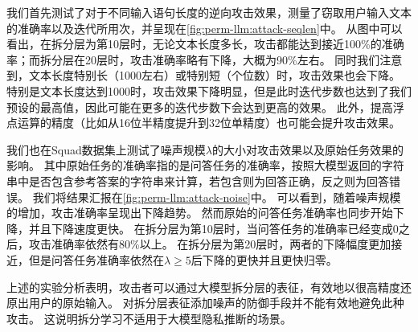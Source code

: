 %
我们首先测试了对于不同输入语句长度的逆向攻击效果，测量了窃取用户输入文本的准确率以及迭代所用次，并呈现在\autoref{fig:perm-llm:attack-seqlen}中。
%
从图中可以看出，在拆分层为第10层时，无论文本长度多长，攻击都能达到接近100\%的准确率；而拆分层在20层时，攻击准确率略有下降，大概为90\%左右。
同时我们注意到，文本长度特别长（1000左右）或特别短（个位数）时，攻击效果也会下降。
%
特别是文本长度达到1000时，攻击效果下降明显，但是此时迭代步数也达到了我们预设的最高值，因此可能在更多的迭代步数下会达到更高的效果。
%
此外，提高浮点运算的精度（比如从16位半精度提升到32位单精度）也可能会提升攻击效果。


我们也在Squad数据集上测试了噪声规模$\lambda$的大小对攻击效果以及原始任务效果的影响。
其中原始任务的准确率指的是问答任务的准确率，按照大模型返回的字符串中是否包含参考答案的字符串来计算，若包含则为回答正确，反之则为回答错误。
%
我们将结果汇报在\autoref{fig:perm-llm:attack-noise}中。
%
可以看到，随着噪声规模的增加，攻击准确率呈现出下降趋势。
然而原始的问答任务准确率也同步开始下降，并且下降速度更快。
%
在拆分层为第10层时，当问答任务的准确率已经变成0之后，攻击准确率依然有80\%以上。
在拆分层为第20层时，两者的下降幅度更加接近，但是问答任务准确率依然在$\lambda \ge 5$后下降的更快并且更快归零。
%



上述的实验分析表明，攻击者可以通过大模型拆分层的表征，有效地以很高精度还原出用户的原始输入。
%
对拆分层表征添加噪声的防御手段并不能有效地避免此种攻击。
%
这说明拆分学习不适用于大模型隐私推断的场景。
